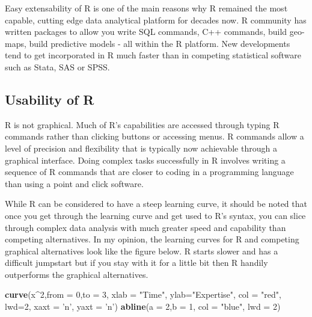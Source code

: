 \documentclass[
]{krantz}
\makeatletter
\newenvironment{Shaded}{\begin{snugshade}}{\end{snugshade}}
\newcommand{\DataTypeTok}[1]{\textcolor[rgb]{0.27,0.27,0.27}{#1}}
\newcommand{\DecValTok}[1]{\textcolor[rgb]{0.06,0.06,0.06}{#1}}
\newcommand{\KeywordTok}[1]{\textcolor[rgb]{0.27,0.27,0.27}{\textbf{#1}}}
\newcommand{\NormalTok}[1]{#1}
\newcommand{\OperatorTok}[1]{\textcolor[rgb]{0.43,0.43,0.43}{\textbf{#1}}}
\newcommand{\StringTok}[1]{\textcolor[rgb]{0.5,0.5,0.5}{#1}}
\newenvironment{kframe}{%
\medskip{}
\setlength{\fboxsep}{.8em}
 \def\at@end@of@kframe{}%
 \ifinner\ifhmode%
  \def\at@end@of@kframe{\end{minipage}}%
  \begin{minipage}{\columnwidth}%
 \fi\fi%
 \def\FrameCommand##1{\hskip\@totalleftmargin \hskip-\fboxsep
 \colorbox{shadecolor}{##1}\hskip-\fboxsep
     \hskip-\linewidth \hskip-\@totalleftmargin \hskip\columnwidth}%
 \MakeFramed {\advance\hsize-\width
   \@totalleftmargin\z@ \linewidth\hsize
   \@setminipage}}%
 {\par\unskip\endMakeFramed%
 \at@end@of@kframe}
\renewenvironment{Shaded}{\begin{kframe}}{\end{kframe}}
\makeatother
\begin{document}
Easy extensability of R is one of the main reasons why R remained the most capable, cutting edge data analytical platform for decades now. R community has written packages to allow you write SQL commands, C++ commands, build geo-maps, build predictive models - all within the R platform. New developments tend to get incorporated in R much faster than in competing statistical software such as Stata, SAS or SPSS.

\hypertarget{usability-of-r}{%
\subsection{Usability of R}\label{usability-of-r}}

R is not graphical. Much of R's capabilities are accessed through typing R commands rather than clicking buttons or accessing menus. R commands allow a level of precision and flexibility that is typically now achievable through a graphical interface. Doing complex tasks successfully in R involves writing a sequence of R commands that are closer to coding in a programming language than using a point and click software.

While R can be considered to have a steep learning curve, it should be noted that once you get through the learning curve and get used to R's syntax, you can slice through complex data analysis with much greater speed and capability than competing alternatives. In my opinion, the learning curves for R and competing graphical alternatives look like the figure below. R starts slower and has a difficult jumpstart but if you stay with it for a little bit then R handily outperforms the graphical alternatives.

\begin{Shaded}
\begin{Highlighting}[]
\KeywordTok{curve}\NormalTok{(x}\OperatorTok{^}\DecValTok{2}\NormalTok{,}\DataTypeTok{from =} \DecValTok{0}\NormalTok{,}\DataTypeTok{to =} \DecValTok{3}\NormalTok{, }\DataTypeTok{xlab =} \StringTok{"Time"}\NormalTok{, }\DataTypeTok{ylab=}\StringTok{"Expertise"}\NormalTok{, }
      \DataTypeTok{col =} \StringTok{"red"}\NormalTok{, }\DataTypeTok{lwd=}\DecValTok{2}\NormalTok{, }\DataTypeTok{xaxt =} \StringTok{'n'}\NormalTok{, }\DataTypeTok{yaxt =} \StringTok{'n'}\NormalTok{)}
\KeywordTok{abline}\NormalTok{(}\DataTypeTok{a =} \DecValTok{2}\NormalTok{,}\DataTypeTok{b =} \DecValTok{1}\NormalTok{, }\DataTypeTok{col =} \StringTok{"blue"}\NormalTok{, }\DataTypeTok{lwd =} \DecValTok{2}\NormalTok{)}
\end{Highlighting}
\end{Shaded}
\end{document}
